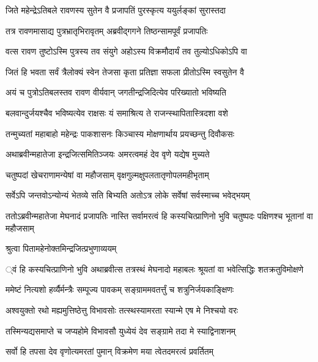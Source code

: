 
\twolineshloka
{जिते महेन्द्रेऽतिबले रावणस्य सुतेन वै}
{प्रजापतिं पुरस्कृत्य ययुर्लङ्कां सुरास्तदा} %

\twolineshloka
{तत्र रावणमासाद्य पुत्रभ्रातृभिरावृतम्}
{अब्रवीद्गगने तिष्ठन्सामपूर्वं प्रजापतिः} %

\twolineshloka
{वत्स रावण तुष्टोऽस्मि पुत्रस्य तव संयुगे}
{अहोऽस्य विक्रमौदार्यं तव तुल्योऽधिकोऽपि वा} %

\twolineshloka
{जितं हि भवता सर्वं त्रैलोक्यं स्वेन तेजसा}
{कृता प्रतिज्ञा सफला प्रीतोऽस्मि स्वसुतेन वै} %

\twolineshloka
{अयं च पुत्रोऽतिबलस्तव रावण वीर्यवान्}
{जगतीन्द्रजिदित्येव परिख्यातो भविष्यति} %

\twolineshloka
{बलवान्दुर्जयश्चैव भविष्यत्येव राक्षसः}
{यं समाश्रित्य ते राजन्स्थापितास्त्रिदशा वशे} %

\twolineshloka
{तन्मुच्यतां महाबाहो महेन्द्रः पाकशासनः}
{किञ्चास्य मोक्षणार्थाय प्रयच्छन्तु दिवौकसः} %

\twolineshloka
{अथाब्रवीन्महातेजा इन्द्रजित्समितिञ्जयः}
{अमरत्वमहं देव वृणे यद्येष मुच्यते} %

\twolineshloka
{चतुष्पदां खेचराणामन्येषां वा महौजसाम्}
{वृक्षगुल्मक्षुपलतातृणोपलमहीभृताम्} %

\twolineshloka
{सर्वेऽपि जन्तवोऽन्योन्यं भेतव्ये सति बिभ्यति}
{अतोऽत्र लोके सर्वेषां सर्वस्माच्च भवेद्भयम्} %

\threelineshloka
{ततोऽब्रवीन्महातेजा मेघनादं प्रजापतिः}
{नास्ति सर्वामरत्वं हि कस्यचित्प्राणिनो भुवि}
{चतुष्पदः पक्षिणश्च भूतानां वा महौजसाम्} %

\onelineshloka
{श्रुत्वा पितामहेनोक्तमिन्द्रजित्प्रभुणाव्ययम्} %

\threelineshloka
{्वं हि कस्यचित्प्राणिनो भुवि}
{अथाब्रवीत्स तत्रस्थं मेघनादो महाबलः}
{श्रूयतां वा भवेत्सिद्धिः शतक्रतुविमोक्षणे} %

\twolineshloka
{ममेष्टं नित्यशो हर्व्यैर्मन्त्रैः सम्पूज्य पावकम्}
{सङ्ग्राममवतर्त्तुं च शत्रुनिर्जयकाङ्क्षिणः} %

\twolineshloka
{अश्वयुक्तो रथो मह्यमुत्तिष्ठेत्तु विभावसोः}
{तत्स्थस्यामरता स्यान्मे एष मे निश्चयो वरः} %

\twolineshloka
{तस्मिन्यद्यसमाप्ते च जप्यहोमे विभावसौ}
{युध्येयं देव सङ्ग्रामे तदा मे स्याद्विनाशनम्} %

\twolineshloka
{सर्वो हि तपसा देव वृणोत्यमरतां पुमान्}
{विक्रमेण मया त्वेतदमरत्वं प्रवर्तितम्} %

